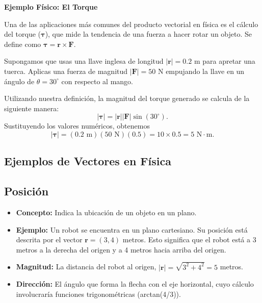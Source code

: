 \documentclass[11pt,a4paper]{book}
\begin{document}
\textbf{Ejemplo Físico: El Torque }

Una de las aplicaciones más comunes del producto vectorial en física es el cálculo del torque ($\boldsymbol{\tau}$), que mide la tendencia de una fuerza a hacer rotar un objeto. Se define como $\boldsymbol{\tau} = \boldsymbol{r} \times \boldsymbol{F}$.

Supongamos que usas una llave inglesa de longitud $|\boldsymbol{r}| = 0.2 \text{ m}$ para apretar una tuerca. Aplicas una fuerza de magnitud $|\boldsymbol{F}| = 50 \text{ N}$ empujando la llave en un ángulo de $\theta = 30^\circ$ con respecto al mango.

Utilizando nuestra definición, la magnitud del torque generado se calcula de la siguiente manera:
\begin{equation}
    |\boldsymbol{\tau}| = |\boldsymbol{r}| |\boldsymbol{F}| \sin(30^\circ).
\end{equation}
Sustituyendo los valores numéricos, obtenemos
\begin{equation}
    |\boldsymbol{\tau}| = (0.2 \text{ m})(50 \text{ N})(0.5) = 10 \times 0.5 = 5 \text{ N}\cdot\text{m}.
\end{equation}

\subsection{Ejemplos de Vectores en Física}

\subsection{Posición}
\begin{itemize}
    \item \textbf{Concepto:} Indica la ubicación de un objeto en un plano.
    \item \textbf{Ejemplo:} Un robot se encuentra en un plano cartesiano. Su posición está descrita por el vector $\textbf{r} = (3, 4)$ metros. Esto significa que el robot está a 3 metros a la derecha del origen y a 4 metros hacia arriba del origen.
    \item \textbf{Magnitud:} La distancia del robot al origen, $|\textbf{r}|=\sqrt{3^2+4^2}= 5$ metros.
    \item \textbf{Dirección:} El ángulo que forma la flecha con el eje horizontal, cuyo cálculo involucraría funciones trigonométricas (arctan(4/3)).
\end{itemize}
\end{document}
